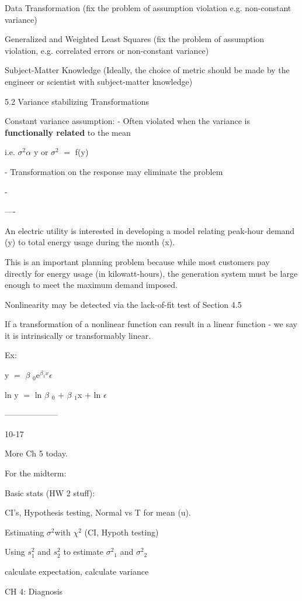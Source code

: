 \documentclass[12pt]{extarticle}
\newcommand{\mt}[1]{\ensuremath{#1}}
\newcommand{\ep}{\mt{\epsilon} }         %
\newcommand{\afa}{\mt{\alpha} }
\newcommand{\bta}{\mt{\beta} }
\newcommand{\ps}{\mt{\operatorname{+}} }
\newcommand{\eql}{ \mt{\operatorname{=}} }
\newcommand{\uw}[2]{#1\mt{_{#2}}}
\newcommand{\uf}[2]{#1\mt{^{#2}}}
\newcommand{\txt}[1]{\text{#1}} %
\newcommand{\ssq}{\mt{\sigma^2}}
\newcommand{\exv}[1]{\txt{E[}#1\txt{]}}
\begin{document}
Data Transformation (fix the problem of assumption violation e.g. non-constant variance)

Generalized and Weighted Least Squares (fix the problem of assumption violation, e.g. correlated errors or non-constant variance)

Subject-Matter Knowledge (Ideally, the choice of metric should be made by the engineer or scientist with subject-matter knowledge)

5.2 Variance stabilizing Transformations

Constant variance assumption:
- Often violated when the variance is \textbf{functionally related} to the mean

i.e. \ssq \afa \exv{y} or \ssq \eql f(\exv{y})

- Transformation on the response may eliminate the problem

- 

----

An electric utility is interested in developing a model relating peak-hour demand (y) to total energy usage during the month (x).

This is an important planning problem because while most customers pay directly for energy usage (in kilowatt-hours), the generation system must be large enough to meet the maximum demand imposed.


Nonlinearity may be detected via the lack-of-fit test of Section 4.5

If a transformation of a nonlinear function can result in a linear function - we say it is intrinsically or transformably linear.

Ex:

y \eql \uw{\bta}{0}\uf{e}{\bta_1x}\ep 

ln y \eql ln \uw{\bta}{0} \ps \uw{\bta}{1}x \ps ln \ep

--------------------

10-17

More Ch 5 today.

For the midterm:

Basic stats (HW 2 stuff):

CI's, Hypothesis testing, Normal vs T for mean (u).

Estimating \ssq with $\chi^2$ (CI, Hypoth testing)

Using $s_1^2$ and $s_2^2$ to estimate \ssq$_1$ and \ssq$_2$

calculate expectation, calculate variance

CH 4: Diagnosis
\end{document}
